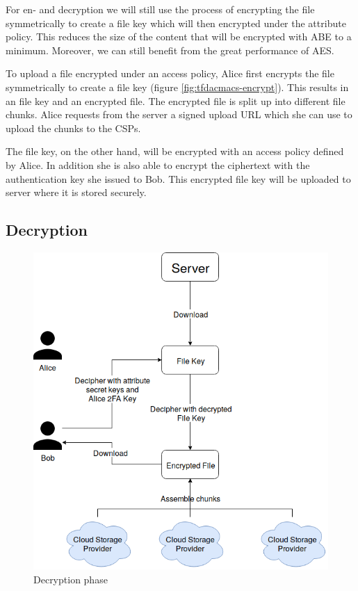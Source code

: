 For en- and decryption we will still use the process of encrypting the file symmetrically to create a file key which will then encrypted under the attribute policy. This reduces the size of the content that will be encrypted with ABE to a minimum. Moreover, we can still benefit from the great performance of \ac{AES}. 

To upload a file encrypted under an access policy, Alice first encrypts the file symmetrically to create a file key (figure \ref{fig:tfdacmacs-encrypt}). This results in an file key and an encrypted file. The encrypted file is split up into different file chunks. Alice requests from the server a signed upload URL which she can use to upload the chunks to the CSPs. 

The file key, on the other hand, will be encrypted with an access policy defined by Alice. In addition she is also able to encrypt the ciphertext with the authentication key she issued to Bob. This encrypted file key will be uploaded to server where it is stored securely. 

\subsection{Decryption}
\begin{figure}[!t]
\centering
    \includegraphics[width=\linewidth]{img/TF-DAC-MACS-overview-decrypt.png}
    \caption{Decryption phase}
    \label{fig:tfdacmacs-decryption}
\end{figure}

